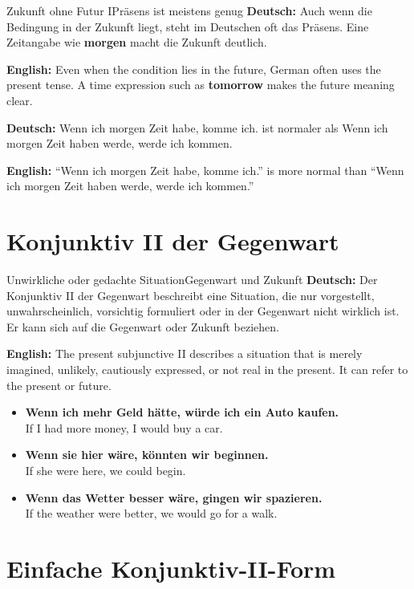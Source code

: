 \documentclass[a4paper,11pt]{article}
\newcommand{\GermanText}[1]{\textbf{Deutsch: }#1\par}
\newcommand{\EnglishText}[1]{{\small\color{SoftGray}\textbf{English: }#1\par}}
\newcommand{\ExampleItem}[2]{\item \textbf{#1}\\{\small\color{SoftGray}#2}}
\begin{document}
        \begin{grammarentry}{Zukunft ohne Futur I}{Präsens ist meistens genug}
            \GermanText{Auch wenn die Bedingung in der Zukunft liegt, steht im Deutschen oft das Präsens. Eine Zeitangabe wie \textbf{morgen} macht die Zukunft deutlich.}
            \EnglishText{Even when the condition lies in the future, German often uses the present tense. A time expression such as \textbf{tomorrow} makes the future meaning clear.}

            \GermanText{\glqq Wenn ich morgen Zeit habe, komme ich.\grqq{} ist normaler als \glqq Wenn ich morgen Zeit haben werde, werde ich kommen.\grqq}
            \EnglishText{``Wenn ich morgen Zeit habe, komme ich.'' is more normal than ``Wenn ich morgen Zeit haben werde, werde ich kommen.''}
        \end{grammarentry}

    \section{Konjunktiv II der Gegenwart}

        \begin{grammarentry}{Unwirkliche oder gedachte Situation}{Gegenwart und Zukunft}
            \GermanText{Der Konjunktiv II der Gegenwart beschreibt eine Situation, die nur vorgestellt, unwahrscheinlich, vorsichtig formuliert oder in der Gegenwart nicht wirklich ist. Er kann sich auf die Gegenwart oder Zukunft beziehen.}
            \EnglishText{The present subjunctive II describes a situation that is merely imagined, unlikely, cautiously expressed, or not real in the present. It can refer to the present or future.}
        \end{grammarentry}

        \begin{exbox}
            \begin{itemize}
                \ExampleItem{Wenn ich mehr Geld hätte, würde ich ein Auto kaufen.}{If I had more money, I would buy a car.}
                \ExampleItem{Wenn sie hier wäre, könnten wir beginnen.}{If she were here, we could begin.}
                \ExampleItem{Wenn das Wetter besser wäre, gingen wir spazieren.}{If the weather were better, we would go for a walk.}
            \end{itemize}
        \end{exbox}

    \section{Einfache Konjunktiv-II-Form}
\end{document}
